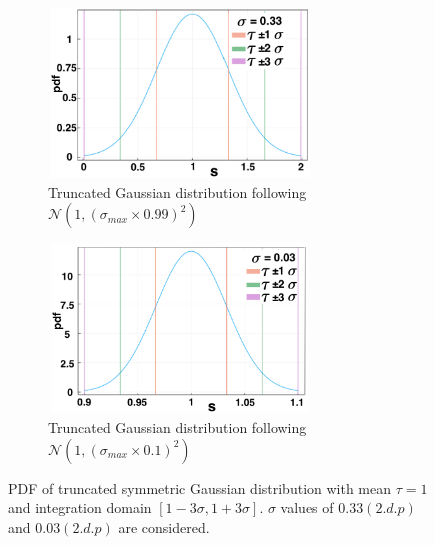 \begin{figure}[H]
    \centering
    \begin{subfigure}[t]{0.45\textwidth}
        \centering
        \includegraphics[width=7cm,height=4.5cm]{t1sig1.png}
        \caption{Truncated Gaussian distribution following $\mathcal{N}(1,(\sigma_{max}\times0.99)^2)$}
        \label{}
    \end{subfigure}
    \hfill
    \begin{subfigure}[t]{0.45\textwidth}
        \centering
        \includegraphics[width=7cm,height=4.5cm]{t1sig2.png}
        \caption{Truncated Gaussian distribution following $\mathcal{N}(1,(\sigma_{max}\times0.1)^2)$}
        \label{}
    \end{subfigure}
\caption{PDF of truncated symmetric Gaussian distribution with mean $\tau=1$ and integration domain $[1-3\sigma,1+3\sigma]$. $\sigma$ values of $0.33(2.d.p)$ and $0.03(2.d.p)$ are considered.}
\label{fig:pdf1}
\end{figure}
